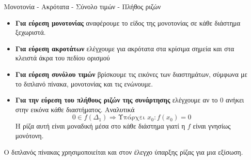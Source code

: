 \begin{askhsh}{Μονοτονία - Ακρότατα - Σύνολο τιμών - Πλήθος ριζών}
\begin{bhma}
{\begin{mytblr}{}
\end{mytblr}
}{
\begin{itemize}[leftmargin=5mm]
\item \textbf{Για εύρεση μονοτονίας} αναφέρουμε το είδος της μονοτονίας σε κάθε διάστημα ξεχωριστά. 
\item \textbf{Για εύρεση ακροτάτων} ελέγχουμε για ακρότατα στα κρίσιμα σημεία και στα κλειστά άκρα του πεδίου ορισμού 
\item \textbf{Για εύρεση συνόλου τιμών} βρίσκουμε τις εικόνες των διαστημάτων, σύμφωνα με το διπλανό πίνακα, μονοτονίας και τις ενώνουμε.
\item \textbf{Για την εύρεση του πλήθους ριζών της συνάρτησης} ελέγχουμε αν το $ 0 $ ανήκει στην εικόνα κάθε διαστήματος. Αναλυτικά
\[ 0\in f(\Delta_1)\Rightarrow \textrm{Υπάρχει }x_0 : f(x_0)=0 \]
Η ρίζα αυτή είναι μοναδική μέσα στο κάθε διάστημα γιατί η $ f $ είναι γνησίως μονότονη.
\end{itemize}
Ο διπλανός πίνακας χρησιμοποιείται και στον έλεγχο ύπαρξης ρίζας για μια εξίσωση.}
\end{bhma}
\end{askhsh}\vspace{1cm}


